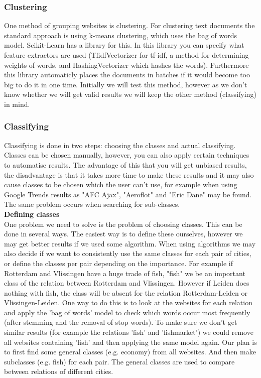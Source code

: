 \subsubsection{Clustering}
One method of grouping websites is clustering. For clustering text documents the standard approach is using k-means clustering, which uses the bag of words model. Scikit-Learn \cite{scikit-learn} has a library for this. In this library you can specify what feature extractors are used (TfidfVectorizer for tf-idf, a method for determining weights of words, and HashingVectorizer which hashes the words). Furthermore this library automaticly places the documents in batches if it would become too big to do it in one time. Initially we will test this method, however as we don't know whether we will get valid results we will keep the other method (classifying) in mind.

\subsubsection{Classifying}
Classifying is done in two steps: choosing the classes and actual classifying. Classes can be chosen manually, however, you can also apply certain techniques to automatise results. The advantage of this that you will get unbiased results, the disadvantage is that it takes more time to make these results and it may also cause classes to be chosen which the user can't use, for example when using Google Trends  \cite{googleTrends}  results as "AFC Ajax", "Aeroflot" and "Eric Dane" may be found. The same problem occurs when searching for sub-classes.\\

\textbf{Defining classes}\\
One problem we need to solve is the problem of choosing classes. This can be done in several ways. The easiest way is to define these ourselves, however we may get better results if we used some algorithm. When using algorithms we may also decide if we want to consistently use the same classes for each pair of cities, or define the classes per pair depending on the importance. For example if Rotterdam and Vlissingen have a huge trade of fish, "fish" we be an important class of the relation between Rotterdam and Vlissingen. However if Leiden does nothing with fish, the class will be absent for the relation Rotterdam-Leiden or Vlissingen-Leiden. One way to do this is to look at the websites for each relation and apply the 'bag of words' model to check which words occur most frequently (after stemming and the removal of stop words). To make sure we don't get similar results (for example the relations 'fish' and 'fishmarket') we could remove all websites containing 'fish' and then applying the same model again. Our plan is to first find some general classes (e.g. economy) from all websites. And then make subclasses (e.g. fish) for each pair. The general classes are used to compare between relations of different cities.\\

